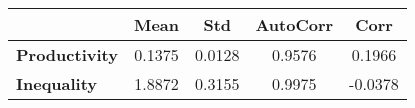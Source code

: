 \begin{tiny}\begin{tabular}{|l|c|c|c|c|}
\hline
&\textbf{Mean}&\textbf{Std}&\textbf{AutoCorr}&\textbf{Corr}\\\hline
\textbf{Productivity}&0.1375&0.0128&0.9576&0.1966\\\hline
\textbf{Inequality}&1.8872&0.3155&0.9975&-0.0378\\\hline
\end{tabular}
\end{tiny}